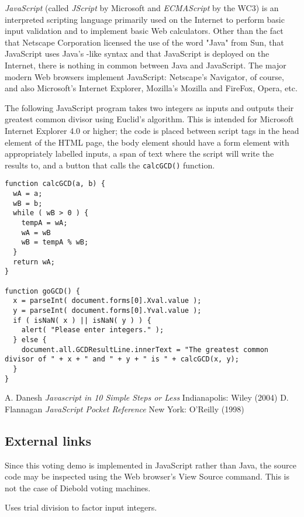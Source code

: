 \documentclass[12pt]{article}
\begin{document}
{\em JavaScript} (called {\em JScript} by Microsoft and {\em ECMAScript} by the WC3) is an interpreted scripting language primarily used on the Internet to perform basic input validation and to implement basic Web calculators. Other than the fact that Netscape Corporation licensed the use of the word "Java" from Sun, that JavaScript uses Java's -like syntax and that JavaScript is deployed on the Internet, there is nothing in common between Java and JavaScript. The major modern Web browsers implement JavaScript: Netscape's Navigator, of course, and also Microsoft's Internet Explorer, Mozilla's Mozilla and FireFox, Opera, etc.

The following JavaScript program takes two integers as inputs and outputs their greatest common divisor using Euclid's algorithm. This is intended for Microsoft Internet Explorer 4.0 or higher; the code is placed between script tags in the head element of the HTML page, the body element should have a form element with appropriately labelled inputs, a span of text where the script will write the results to, and a button that calls the \verb=calcGCD()= function.

\begin{verbatim}
function calcGCD(a, b) {
  wA = a;
  wB = b;
  while ( wB > 0 ) {
    tempA = wA;
    wA = wB
    wB = tempA % wB;
  }
  return wA;
}

function goGCD() {
  x = parseInt( document.forms[0].Xval.value );  
  y = parseInt( document.forms[0].Yval.value );
  if ( isNaN( x ) || isNaN( y ) ) {
    alert( "Please enter integers." );
  } else {
    document.all.GCDResultLine.innerText = "The greatest common divisor of " + x + " and " + y + " is " + calcGCD(x, y);
  } 
}
\end{verbatim}

\begin{thebibliography}{2}
 A. Danesh {\it Javascript in 10 Simple Steps or Less} Indianapolis: Wiley (2004)
 D. Flannagan {\it JavaScript Pocket Reference} New York: O'Reilly (1998)
\end{thebibliography}

\subsection{External links}

 Since this voting demo is implemented in JavaScript rather than Java, the source code may be inspected using the Web browser's View Source command. This is not the case of Diebold voting machines.

 Uses trial division to factor input integers.

\end{document}
